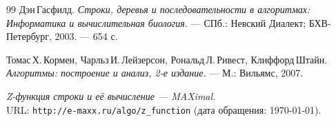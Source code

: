 \begin{thebibliography}{99}
Дэн\,Гасфилд.
{\itshape Строки, деревья и последовательности в алгоритмах: Информатика и вычислительная биология.} --- СПб.: Невский Диалект; БХВ-Петербург, 2003. --- 654 с.

Томас\,Х.\,Кормен, Чарльз\,И.\,Лейзерсон, Рональд\,Л.\,Ривест, Клиффорд\,Штайн.
{\itshape Алгоритмы: построение и анализ, 2-е издание.} --- М.: Вильямс, 2007.

{\itshape Z-функция строки и её вычисление — MAXimal.} \\URL: \texttt{http://e-maxx.ru/algo/z\_function} (дата обращения: \today).
\end{thebibliography}
\pagebreak